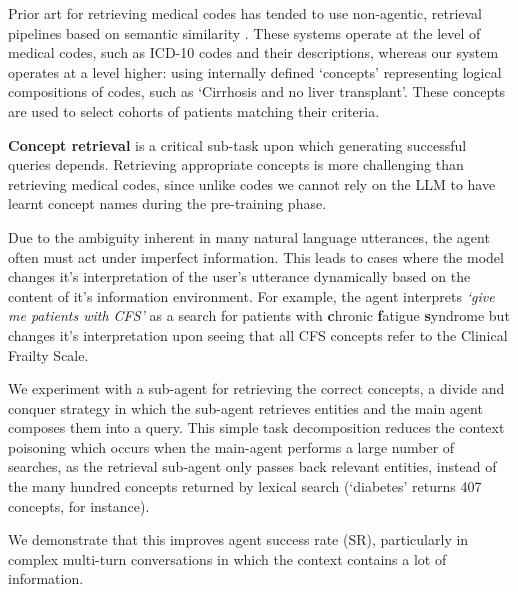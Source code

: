 \documentclass[11pt]{article}
\begin{document}
Prior art for retrieving medical codes has tended to use non-agentic, retrieval pipelines based on semantic similarity \citet{baksi_medcoder_2024, ziletti_retrieval_2024}.
These systems operate at the level of medical codes, such as ICD-10 codes and their descriptions, whereas our system operates at a level higher: using internally defined `concepts' representing logical compositions of codes, such as `Cirrhosis and no liver transplant'.
These concepts are used to select cohorts of patients matching their criteria.

\textbf{Concept retrieval} is a critical sub-task upon which generating successful queries depends.
Retrieving appropriate concepts is more challenging than retrieving medical codes, since unlike codes we cannot rely on the LLM to have learnt concept names during the pre-training phase.

Due to the ambiguity inherent in many natural language utterances, the agent often must act under imperfect information.
This leads to cases where the model changes it's interpretation of the user's utterance dynamically based on the content of it's information environment.
For example, the agent interprets \textit{`give me patients with CFS'} as a search for patients with \textbf{c}hronic \textbf{f}atigue \textbf{s}yndrome but changes it's interpretation upon seeing that all CFS concepts refer to the Clinical Frailty Scale. 

We experiment with a sub-agent for retrieving the correct concepts, a divide and conquer strategy in which the sub-agent retrieves entities and the main agent composes them into a query.
This simple task decomposition reduces the context poisoning which occurs when the main-agent performs a large number of searches, as the retrieval sub-agent only passes back relevant entities, instead of the many hundred concepts returned by lexical search (`diabetes' returns 407 concepts, for instance).

We demonstrate that this improves agent success rate (SR), particularly in complex multi-turn conversations in which the context contains a lot of information.
\end{document}
